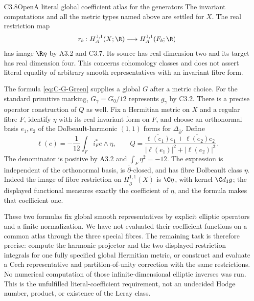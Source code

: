 \begin{claim}{C3.8}{Open}{A literal global coefficient atlas for the generators}
The invariant computations and all the metric types named above are
settled for $X$.  The real restriction map
\[
r_b:H_A^{1,1}(X;\R)\longrightarrow H_A^{1,1}(F_b;\R)
\]
has image $\R\eta$ by A3.2 and C3.7.  Its source has real dimension
two and its target has real dimension four.  This concerns
cohomology classes and does not assert literal equality of arbitrary
smooth representatives with an invariant fibre form.

The formula \eqref{eq:C-G-Green} supplies a global $G$ after a metric
choice.  For the standard primitive marking, $G_\gamma=G_0/12$
represents $g_\gamma$ by C3.2.  There is a precise operator
construction of $Q$ as well.  Fix a Hermitian metric on $X$ and a
regular fibre $F$, identify $\eta$ with its real invariant form on
$F$, and choose an orthonormal basis $e_1,e_2$ of the Dolbeault-harmonic
$(1,1)$ forms for $\Delta_{\bar\partial}$.  Define
\[
\ell(e)=-\frac1{12}\int_F i_F^*e\wedge\eta,\qquad
Q=\frac{\overline{\ell(e_1)}e_1+
            \overline{\ell(e_2)}e_2}
          {|\ell(e_1)|^2+|\ell(e_2)|^2}.
\]
The denominator is positive by A3.2 and
$\int_F\eta^2=-12$.  The expression is independent of the
orthonormal basis, is $\bar\partial$-closed, and has fibre
Dolbeault class $\eta$.  Indeed the image of fibre restriction on
$H^{1,1}_{\bar\partial}(X)$ is $\C\eta$, with kernel
$\C d_1g$; the displayed functional measures exactly the coefficient
of $\eta$, and the formula makes that coefficient one.

These two formulas fix global smooth representatives by explicit
elliptic operators and a finite normalization.  We have not evaluated
their coefficient functions on a common atlas through the three
special fibres.  The remaining task is therefore precise: compute
the harmonic projector and the two displayed restriction integrals
for one fully specified global Hermitian metric, or construct and
evaluate a Cech representative and partition-of-unity correction
with the same restrictions.  No numerical computation of those
infinite-dimensional elliptic inverses was run.  This is the
unfulfilled literal-coefficient requirement, not an undecided Hodge
number, product, or existence of the Leray class.
\end{claim}
